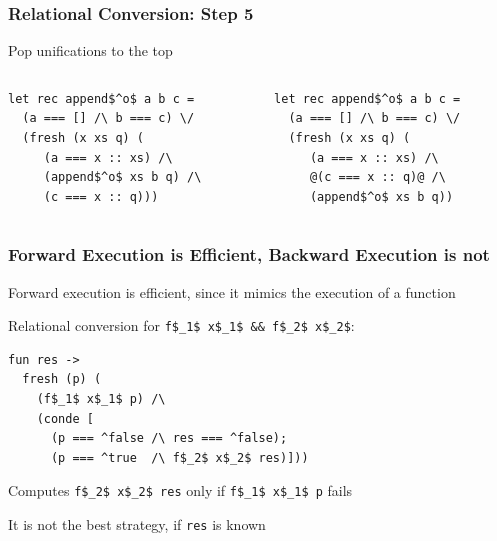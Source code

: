 \documentclass[xcolor=table]{beamer}
\begin{document}
\begin{frame}[fragile]
  \transwipe[direction=90]
  \frametitle{Relational Conversion: Step 5}
  
Pop unifications to the top

\begin{columns}
\begin{column}{0.5\textwidth}
\begin{lstlisting}
let rec append$^o$ a b c =
  (a === [] /\ b === c) \/
  (fresh (x xs q) (
     (a === x :: xs) /\
     (append$^o$ xs b q) /\
     (c === x :: q)))
\end{lstlisting}
\end{column}
\begin{column}{0.5\textwidth}  
\begin{lstlisting}
let rec append$^o$ a b c =
  (a === [] /\ b === c) \/
  (fresh (x xs q) (
     (a === x :: xs) /\
     @(c === x :: q)@ /\
     (append$^o$ xs b q))
\end{lstlisting}
\end{column}
\end{columns}
\end{frame}


\begin{frame}[fragile]
  \transwipe[direction=90]
  \frametitle{Forward Execution is Efficient, Backward Execution is not}
  
  Forward execution is efficient, since it mimics the execution of a function
  
\vspace{6pt}  
  
Relational conversion for \lstinline{f$_1$ x$_1$ && f$_2$ x$_2$}: 
 
\begin{lstlisting}
fun res ->
  fresh (p) (
    (f$_1$ x$_1$ p) /\
    (conde [
      (p === ^false /\ res === ^false);
      (p === ^true  /\ f$_2$ x$_2$ res)]))
\end{lstlisting} 

Computes \lstinline{f$_2$ x$_2$ res} only if \lstinline{f$_1$ x$_1$ p} fails

\vspace{6pt}

It is not the best strategy, if \lstinline{res} is known

\end{frame}
\end{document}
